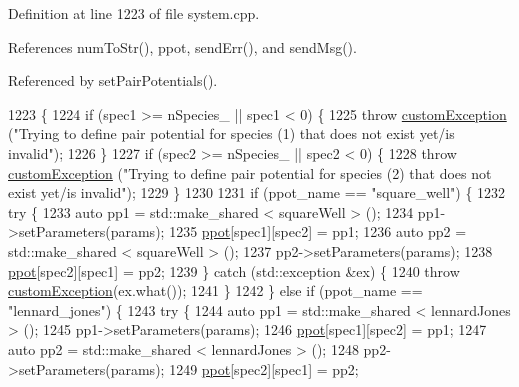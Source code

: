 Definition at line 1223 of file system.\-cpp.



References num\-To\-Str(), ppot, send\-Err(), and send\-Msg().



Referenced by set\-Pair\-Potentials().


\begin{DoxyCode}
1223                                                                                                            
                                                                         \{
1224     \textcolor{keywordflow}{if} (spec1 >= nSpecies\_ || spec1 < 0) \{
1225         \textcolor{keywordflow}{throw} \hyperlink{classcustom_exception}{customException} (\textcolor{stringliteral}{"Trying to define pair potential for species (1) that does
       not exist yet/is invalid"});
1226     \}
1227     \textcolor{keywordflow}{if} (spec2 >= nSpecies\_ || spec2 < 0) \{
1228         \textcolor{keywordflow}{throw} \hyperlink{classcustom_exception}{customException} (\textcolor{stringliteral}{"Trying to define pair potential for species (2) that does
       not exist yet/is invalid"});
1229     \}
1230 
1231     \textcolor{keywordflow}{if} (ppot\_name == \textcolor{stringliteral}{"square\_well"}) \{
1232         \textcolor{keywordflow}{try} \{
1233             \textcolor{keyword}{auto} pp1 = std::make\_shared < squareWell > ();
1234             pp1->setParameters(params);
1235             \hyperlink{classsim_system_ad2e290b5963f132e6a3a56cee35c8e9f}{ppot}[spec1][spec2] = pp1;
1236             \textcolor{keyword}{auto} pp2 = std::make\_shared < squareWell > ();
1237             pp2->setParameters(params);
1238             \hyperlink{classsim_system_ad2e290b5963f132e6a3a56cee35c8e9f}{ppot}[spec2][spec1] = pp2;
1239         \} \textcolor{keywordflow}{catch} (std::exception &ex) \{
1240             \textcolor{keywordflow}{throw} \hyperlink{classcustom_exception}{customException}(ex.what());
1241         \}
1242     \} \textcolor{keywordflow}{else} \textcolor{keywordflow}{if} (ppot\_name == \textcolor{stringliteral}{"lennard\_jones"}) \{
1243         \textcolor{keywordflow}{try} \{
1244             \textcolor{keyword}{auto} pp1 = std::make\_shared < lennardJones > ();
1245             pp1->setParameters(params);
1246             \hyperlink{classsim_system_ad2e290b5963f132e6a3a56cee35c8e9f}{ppot}[spec1][spec2] = pp1;
1247             \textcolor{keyword}{auto} pp2 = std::make\_shared < lennardJones > ();
1248             pp2->setParameters(params);
1249             \hyperlink{classsim_system_ad2e290b5963f132e6a3a56cee35c8e9f}{ppot}[spec2][spec1] = pp2;

\end{DoxyCode}
